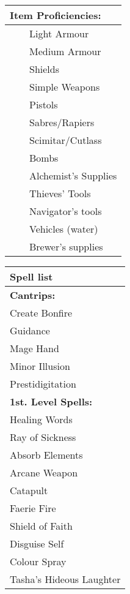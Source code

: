 \documentclass[11pt]{article}
\newcommand{\tabitem}{~~\llap{--}~~}
\begin{document}
\begin{multicols}{2}
\vspace{4mm}

\noindent \begin{tabularx}{\linewidth}{@{}l}
{\Large \textbf{Item Proficiencies:}} \\
\hline
\tabitem Light Armour \\
\tabitem Medium Armour \\
\tabitem Shields \\
\tabitem Simple Weapons \\
\tabitem Pistols \\
\tabitem Sabres/Rapiers \\
\tabitem Scimitar/Cutlass \\
\tabitem Bombs \\
\tabitem Alchemist's Supplies \\
\tabitem Thieves' Tools \\
\tabitem Navigator's tools \\
\tabitem Vehicles (water) \\
\tabitem Brewer's supplies
		\end{tabularx}

\vspace{4mm}

\noindent \begin{tabularx}{\linewidth}{@{}l}
{\Large \textbf{Spell list}} 		\\
\hline
\textbf{Cantrips:}	 				\\
Create Bonfire 				 	 	\\
Guidance 							\\		
Mage Hand							\\		
Minor Illusion						\\		
Prestidigitation					\\		

\textbf{1st. Level Spells:}			\\
Healing Words						\\		
Ray of Sickness						\\
Absorb Elements	 					\\
Arcane Weapon						\\
Catapult							\\
Faerie Fire 						\\
Shield of Faith		 				\\
Disguise Self						\\
Colour Spray						\\
Tasha's Hideous Laughter
		\end{tabularx}
	\end{multicols}
\end{document}
